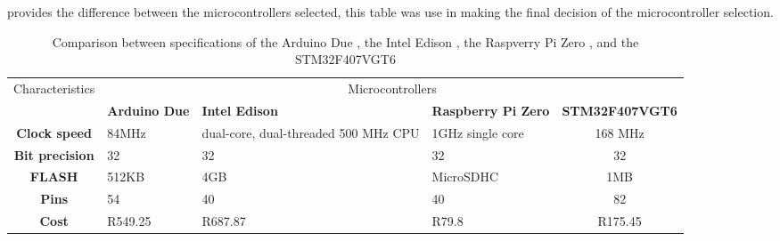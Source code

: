  provides the difference between the microcontrollers selected, this table was use in making the final decision of the microcontroller selection.
\begin{table}[h!]
\centering
\begin{tabular}{cp{5em}p{8em}p{5em}c}
\hline
\hline
\multirow{2}{*}{Characteristics}  & \multicolumn{4}{c}{Microcontrollers} \\  
 & \textbf{Arduino Due} & \textbf{Intel Edison} & \textbf{Raspberry Pi Zero} & \textbf{STM32F407VGT6} \\
\hline
\textbf{Clock speed} & 84MHz &  dual-core, dual-threaded 500 MHz CPU & 1GHz single core & 168 MHz\\
\textbf{Bit precision} & 32 & 32 & 32 & 32 \\
\textbf{FLASH} & 512KB & 4GB & MicroSDHC & 1MB \\
\textbf{Pins} & 54 & 40 & 40 & 82\\
\textbf{Cost} & R549.25 & R687.87 & R79.8 & R175.45\\
\hline
\hline
\end{tabular}
\caption{Comparison between specifications of the Arduino Due \cite{arduino}, the Intel Edison \cite{intel}, the Raspverry Pi Zero \cite{raspberry}, and the STM32F407VGT6\cite{stm}}
\label{table:micro}
\end{table}

